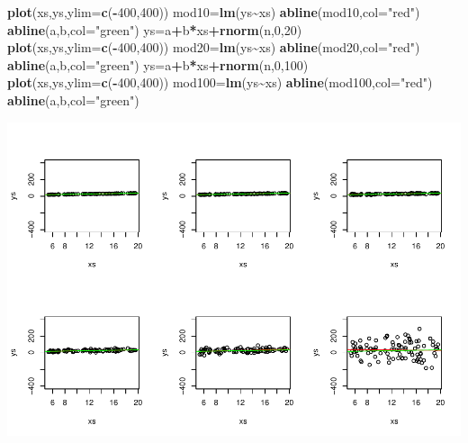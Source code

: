 \documentclass[
]{book}
\newenvironment{Shaded}{\begin{snugshade}}{\end{snugshade}}
\newcommand{\AttributeTok}[1]{\textcolor[rgb]{0.13,0.29,0.53}{#1}}
\newcommand{\DecValTok}[1]{\textcolor[rgb]{0.00,0.00,0.81}{#1}}
\newcommand{\FunctionTok}[1]{\textcolor[rgb]{0.13,0.29,0.53}{\textbf{#1}}}
\newcommand{\NormalTok}[1]{#1}
\newcommand{\OtherTok}[1]{\textcolor[rgb]{0.56,0.35,0.01}{#1}}
\newcommand{\SpecialCharTok}[1]{\textcolor[rgb]{0.81,0.36,0.00}{\textbf{#1}}}
\newcommand{\StringTok}[1]{\textcolor[rgb]{0.31,0.60,0.02}{#1}}
\begin{document}
\begin{Shaded}
\begin{Highlighting}[]
\FunctionTok{plot}\NormalTok{(xs,ys,}\AttributeTok{ylim=}\FunctionTok{c}\NormalTok{(}\SpecialCharTok{{-}}\DecValTok{400}\NormalTok{,}\DecValTok{400}\NormalTok{))}
\NormalTok{mod10}\OtherTok{=}\FunctionTok{lm}\NormalTok{(ys}\SpecialCharTok{\textasciitilde{}}\NormalTok{xs)}
\FunctionTok{abline}\NormalTok{(mod10,}\AttributeTok{col=}\StringTok{"red"}\NormalTok{)}
\FunctionTok{abline}\NormalTok{(a,b,}\AttributeTok{col=}\StringTok{"green"}\NormalTok{)}
\NormalTok{ys}\OtherTok{=}\NormalTok{a}\SpecialCharTok{+}\NormalTok{b}\SpecialCharTok{*}\NormalTok{xs}\SpecialCharTok{+}\FunctionTok{rnorm}\NormalTok{(n,}\DecValTok{0}\NormalTok{,}\DecValTok{20}\NormalTok{)}
\FunctionTok{plot}\NormalTok{(xs,ys,}\AttributeTok{ylim=}\FunctionTok{c}\NormalTok{(}\SpecialCharTok{{-}}\DecValTok{400}\NormalTok{,}\DecValTok{400}\NormalTok{))}
\NormalTok{mod20}\OtherTok{=}\FunctionTok{lm}\NormalTok{(ys}\SpecialCharTok{\textasciitilde{}}\NormalTok{xs)}
\FunctionTok{abline}\NormalTok{(mod20,}\AttributeTok{col=}\StringTok{"red"}\NormalTok{)}
\FunctionTok{abline}\NormalTok{(a,b,}\AttributeTok{col=}\StringTok{"green"}\NormalTok{)}
\NormalTok{ys}\OtherTok{=}\NormalTok{a}\SpecialCharTok{+}\NormalTok{b}\SpecialCharTok{*}\NormalTok{xs}\SpecialCharTok{+}\FunctionTok{rnorm}\NormalTok{(n,}\DecValTok{0}\NormalTok{,}\DecValTok{100}\NormalTok{)}
\FunctionTok{plot}\NormalTok{(xs,ys,}\AttributeTok{ylim=}\FunctionTok{c}\NormalTok{(}\SpecialCharTok{{-}}\DecValTok{400}\NormalTok{,}\DecValTok{400}\NormalTok{))}
\NormalTok{mod100}\OtherTok{=}\FunctionTok{lm}\NormalTok{(ys}\SpecialCharTok{\textasciitilde{}}\NormalTok{xs)}
\FunctionTok{abline}\NormalTok{(mod100,}\AttributeTok{col=}\StringTok{"red"}\NormalTok{)}
\FunctionTok{abline}\NormalTok{(a,b,}\AttributeTok{col=}\StringTok{"green"}\NormalTok{)}
\end{Highlighting}
\end{Shaded}

\includegraphics{ECOMODbook_files/figure-latex/a6.28-1.pdf}
\end{document}
